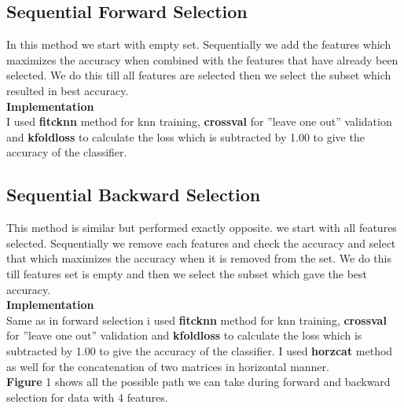 \documentclass[a4paper, 11pt]{article}
\begin{document}
\subsection*{Sequential Forward Selection}
In this method we start with empty set. Sequentially we add the features which maximizes the accuracy when combined with the features that have already been selected. We do this till all features are selected then we select the subset which resulted in best accuracy.\\
\noindent\textbf{Implementation}\\
I used \textbf{fitcknn} method for knn training, \textbf{crossval} for ''leave one out'' validation and \textbf{kfoldloss} to calculate the loss which is subtracted by 1.00 to give the accuracy of the classifier.\\ 

\subsection*{Sequential Backward Selection}
This method is similar but performed exactly opposite. we start with all features selected. Sequentially we remove each features  and check the accuracy and select that which maximizes the accuracy when it is removed from the set. We do this till features set is empty and then we select the subset which gave the best accuracy.\\
\noindent\textbf{Implementation} \\
Same as in forward selection i used \textbf{fitcknn} method for knn training, \textbf{crossval} for ''leave one out'' validation and \textbf{kfoldloss} to calculate the loss which is subtracted by 1.00 to give the accuracy of the classifier. I used \textbf{horzcat} method as well for the concatenation of two matrices in horizontal manner.\\

\textbf{Figure} 1 shows all the possible path we can take during forward and backward selection for data with 4 features.
\end{document}

